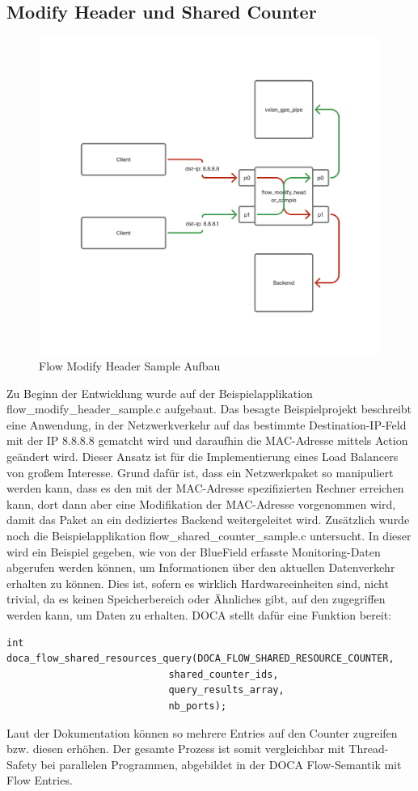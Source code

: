 \subsection{Modify Header und Shared Counter}
\begin{figure}
    \centering
    \includegraphics[width=0.8\linewidth]{images/modify_header.png}
    \caption{Flow Modify Header Sample Aufbau}
    \label{fig:enter-label}
\end{figure}
Zu Beginn der Entwicklung wurde auf der Beispielapplikation flow\_modify\_header\_sample.c aufgebaut. Das besagte Beispielprojekt beschreibt eine Anwendung, in der Netzwerkverkehr auf das bestimmte Destination-IP-Feld mit der IP 8.8.8.8 gematcht wird und daraufhin die MAC-Adresse mittels Action geändert wird. Dieser Ansatz ist für die Implementierung eines Load Balancers von großem Interesse. Grund dafür ist, dass ein Netzwerkpaket so manipuliert werden kann, dass es den mit der MAC-Adresse spezifizierten Rechner erreichen kann, dort dann aber eine Modifikation der MAC-Adresse vorgenommen wird, damit das Paket an ein dediziertes Backend weitergeleitet wird. Zusätzlich wurde noch die Beispielapplikation flow\_shared\_counter\_sample.c untersucht. In dieser wird ein Beispiel gegeben, wie von der BlueField erfasste Monitoring-Daten abgerufen werden können, um Informationen über den aktuellen Datenverkehr erhalten zu können. Dies ist, sofern es wirklich Hardwareeinheiten sind, nicht trivial, da es keinen Speicherbereich oder Ähnliches gibt, auf den zugegriffen werden kann, um Daten zu erhalten. DOCA stellt dafür eine Funktion bereit:
\begin{verbatim}
int doca_flow_shared_resources_query(DOCA_FLOW_SHARED_RESOURCE_COUNTER,
							shared_counter_ids,
							query_results_array,
							nb_ports);
\end{verbatim}
 Laut der Dokumentation können so mehrere Entries auf den Counter zugreifen bzw. diesen erhöhen. Der gesamte Prozess ist somit vergleichbar mit Thread-Safety bei parallelen Programmen, abgebildet in der DOCA Flow-Semantik mit Flow Entries.

